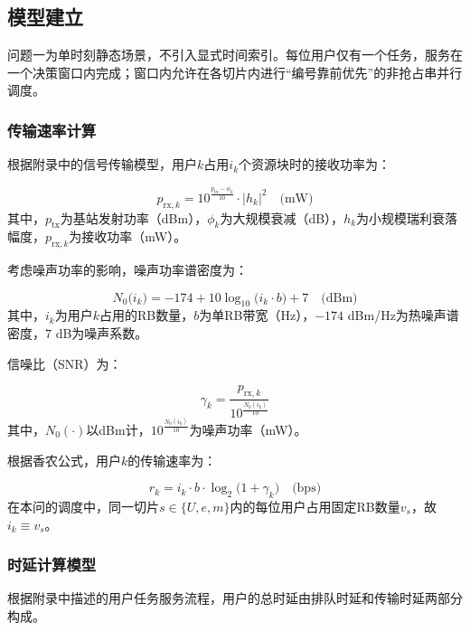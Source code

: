 \subsection{模型建立}

问题一为单时刻静态场景，不引入显式时间索引。每位用户仅有一个任务，服务在一个决策窗口内完成；窗口内允许在各切片内进行“编号靠前优先”的非抢占串并行调度。

\subsubsection{传输速率计算}

根据附录中的信号传输模型，用户$k$占用$i_k$个资源块时的接收功率为：

\begin{equation}
p_{\text{rx},k} = 10^{\frac{p_{\text{tx}} - \phi_k}{10}} \cdot |h_k|^2 \quad \text{(mW)}
\end{equation}
其中，$p_{\text{tx}}$为基站发射功率（dBm），$\phi_k$为大规模衰减（dB），$h_k$为小规模瑞利衰落幅度，$p_{\text{rx},k}$为接收功率（mW）。

考虑噪声功率的影响，噪声功率谱密度为：

\begin{equation}
N_0\big(i_k\big) = -174 + 10\log_{10}\big(i_k \cdot b\big) + 7 \quad \text{(dBm)}
\end{equation}
其中，$i_k$为用户$k$占用的RB数量，$b$为单RB带宽（Hz），$-174$ dBm/Hz为热噪声谱密度，$7$ dB为噪声系数。

信噪比（SNR）为：

\begin{equation}
\gamma_k = \frac{p_{\text{rx},k}}{10^{\frac{N_0\left(i_k\right)}{10}}}
\end{equation}
其中，$N_0(\cdot)$以dBm计，$10^{\frac{N_0\left(i_k\right)}{10}}$为噪声功率（mW）。

根据香农公式，用户$k$的传输速率为：

\begin{equation}
r_k = i_k \cdot b \cdot \log_2\big(1 + \gamma_k\big) \quad \text{(bps)}
\end{equation}
在本问的调度中，同一切片$s\in\{U,e,m\}$内的每位用户占用固定RB数量$v_s$，故$i_k\equiv v_s$。

\subsubsection{时延计算模型}
根据附录中描述的用户任务服务流程，用户的总时延由排队时延和传输时延两部分构成。

